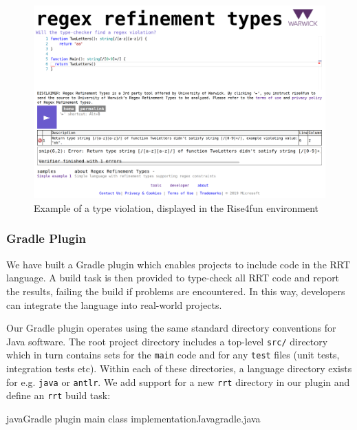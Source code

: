 \documentclass[a4paper,openany,12pt]{book}
\begin{document}
\begin{figure}[H]
    \begin{MyMdframed}
        \vspace{0.5em}


        \caption{\label{figure:r4f}Example of a type violation, displayed in the Rise4fun environment}
        \vspace{0.5em}
        \captionsetup{style=default}

        \centering \includegraphics[width=0.9\linewidth]{rise4fun.png}
    \end{MyMdframed}
\end{figure}

\subsubsection{Gradle Plugin}

We have built a Gradle plugin which enables projects to include code in the RRT language.
A build task is then provided to type-check all RRT code and report the results, failing the build if problems are
encountered.
In this way, developers can integrate the language into real-world projects.

Our Gradle plugin operates using the same standard directory conventions for Java software.
The root project directory includes a top-level \texttt{src/} directory which in turn contains sets for the
\texttt{main} code and for any \texttt{test} files (unit tests, integration tests etc).
\pagebreak[5]
Within each of these directories, a language directory exists for e.g. \texttt{java} or \texttt{antlr}.
We add support for a new \texttt{rrt} directory in our plugin and define an \texttt{rrt} build task:

\begin{mycodefile}{java}{Gradle plugin main class implementation}{Java}{gradle.java}\end{mycodefile}
\end{document}
